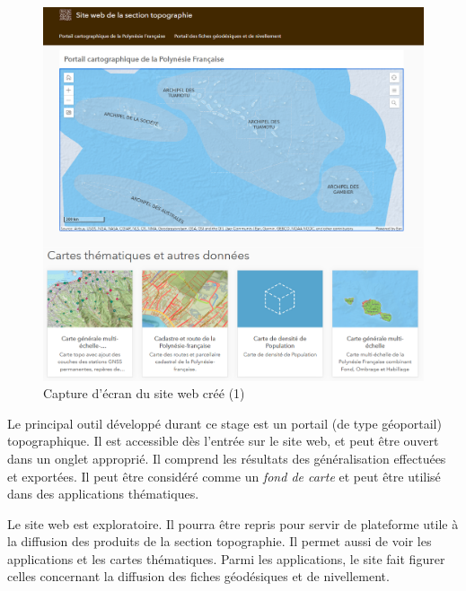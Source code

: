 \documentclass{themeensg}
\begin{document}
\begin{appendices}
\begin{figure}[!h]
\centering
\includegraphics[width=\linewidth]{images/Annexes/siteweb1.png}
\caption{Capture d'écran du site web créé (1) }
\label{site1}
\end{figure}
Le principal outil développé durant ce stage est un portail (de type géoportail) topographique. Il est accessible dès l'entrée sur le site web, et peut être ouvert dans un onglet approprié. Il comprend les résultats des généralisation effectuées et exportées. Il peut être considéré comme un \textit{fond de carte} et peut être utilisé dans des applications thématiques.

Le site web est exploratoire. Il pourra être repris pour servir de plateforme utile à la diffusion des produits de la section topographie. Il permet aussi de voir les applications et les cartes thématiques. Parmi les applications, le site fait figurer celles concernant la diffusion des fiches géodésiques et de nivellement.


\end{appendices}
\end{document}
